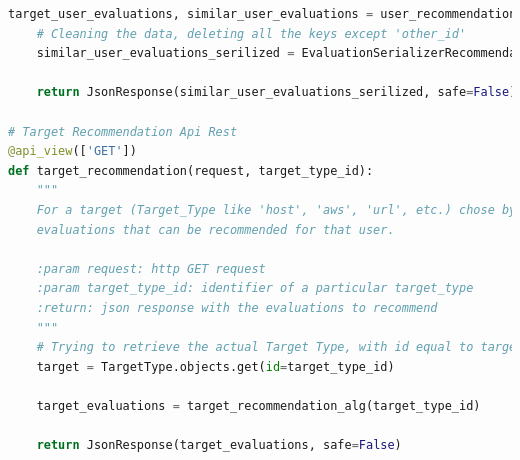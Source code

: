 \begin{lstlisting}[language=Python, label=lst:view_rec, caption={Porzione parziale del codice contenuto nelle View per implementare
    i sistemi di raccomandazione.}]
    target_user_evaluations, similar_user_evaluations = user_recommendation_alg(user_other_id)
    # Cleaning the data, deleting all the keys except 'other_id'
    similar_user_evaluations_serilized = EvaluationSerializerRecommendation(similar_user_evaluations, many=True).data

    return JsonResponse(similar_user_evaluations_serilized, safe=False)

# Target Recommendation Api Rest
@api_view(['GET'])
def target_recommendation(request, target_type_id):
    """
    For a target (Target_Type like 'host', 'aws', 'url', etc.) chose by a user this algorithm search the possible
    evaluations that can be recommended for that user.

    :param request: http GET request
    :param target_type_id: identifier of a particular target_type
    :return: json response with the evaluations to recommend
    """
    # Trying to retrieve the actual Target Type, with id equal to target_type_id, chosed by a user
    target = TargetType.objects.get(id=target_type_id)

    target_evaluations = target_recommendation_alg(target_type_id)

    return JsonResponse(target_evaluations, safe=False)
\end{lstlisting}
\lstset{style=python_code_style}
